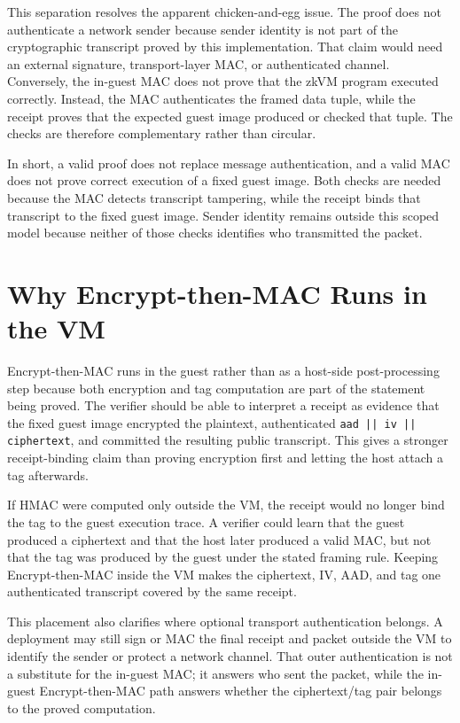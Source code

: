 This separation resolves the apparent chicken-and-egg issue. The proof does not
authenticate a network sender because sender identity is not part of the
cryptographic transcript proved by this implementation. That claim would need an
external signature, transport-layer MAC, or authenticated channel. Conversely,
the in-guest MAC does not prove that the zkVM program executed correctly.
Instead, the MAC authenticates the framed data tuple, while the receipt proves
that the expected guest image produced or checked that tuple. The checks are
therefore complementary rather than circular.

In short, a valid proof does not replace message authentication, and a valid MAC
does not prove correct execution of a fixed guest image. Both checks are needed
because the MAC detects transcript tampering, while the receipt binds that
transcript to the fixed guest image. Sender identity remains outside this scoped
model because neither of those checks identifies who transmitted the packet.

\section{Why Encrypt-then-MAC Runs in the VM}

Encrypt-then-MAC runs in the guest rather than as a host-side post-processing
step because both encryption and tag computation are part of the statement being
proved. The verifier should be able to interpret a receipt as evidence that the
fixed guest image encrypted the plaintext, authenticated
\texttt{aad || iv || ciphertext}, and committed the resulting public transcript.
This gives a stronger receipt-binding claim than proving encryption first and
letting the host attach a tag afterwards.

If HMAC were computed only outside the VM, the receipt would no longer bind the
tag to the guest execution trace. A verifier could learn that the guest produced
a ciphertext and that the host later produced a valid MAC, but not that the tag
was produced by the guest under the stated framing rule. Keeping
Encrypt-then-MAC inside the VM makes the ciphertext, IV, AAD, and tag one
authenticated transcript covered by the same receipt.

This placement also clarifies where optional transport authentication belongs. A
deployment may still sign or MAC the final receipt and packet outside the VM to
identify the sender or protect a network channel. That outer authentication is
not a substitute for the in-guest MAC; it answers who sent the packet, while the
in-guest Encrypt-then-MAC path answers whether the ciphertext/tag pair belongs to
the proved computation.

